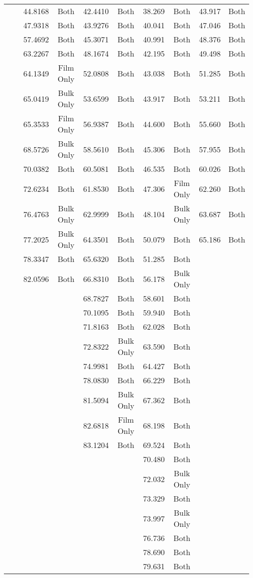 \documentclass[a4paper,12pt,oneside]{article}%
\begin{document}
\begin{table}[b]
\begin{tabular}{cccccccccc}
		&  & 44.8168 & Both & 42.4410 & Both & 38.269 & Both & 43.917 & Both \\
		&  & 47.9318 & Both & 43.9276 & Both & 40.041 & Both & 47.046 & Both \\
		&  & 57.4692 & Both & 45.3071 & Both & 40.991 & Both & 48.376 & Both \\
		&  & 63.2267 & Both & 48.1674 & Both & 42.195 & Both & 49.498 & Both \\
		&  & 64.1349 & Film Only & 52.0808 & Both & 43.038 & Both & 51.285 & Both \\
		&  & 65.0419 & Bulk Only & 53.6599 & Both & 43.917 & Both & 53.211 & Both \\
		&  & 65.3533 & Film Only & 56.9387 & Both & 44.600 & Both & 55.660 & Both \\
		&  & 68.5726 & Bulk Only & 58.5610 & Both & 45.306 & Both & 57.955 & Both \\
		&  & 70.0382 & Both & 60.5081 & Both & 46.535 & Both & 60.026 & Both \\
		&  & 72.6234 & Both & 61.8530 & Both & 47.306 & Film Only & 62.260 & Both \\
		&  & 76.4763 & Bulk Only & 62.9999 & Both & 48.104 & Bulk Only & 63.687 & Both \\
		&  & 77.2025 & Bulk Only & 64.3501 & Both & 50.079 & Both & 65.186 & Both \\
		&  & 78.3347 & Both & 65.6320 & Both & 51.285 & Both &  &  \\
		&  & 82.0596 & Both & 66.8310 & Both & 56.178 & Bulk Only &  &  \\
		&  &  &  & 68.7827 & Both & 58.601 & Both &  &  \\
		&  &  &  & 70.1095 & Both & 59.940 & Both &  &  \\
		&  &  &  & 71.8163 & Both & 62.028 & Both &  &  \\
		&  &  &  & 72.8322 & Bulk Only & 63.590 & Both &  &  \\
		&  &  &  & 74.9981 & Both & 64.427 & Both &  &  \\
		&  &  &  & 78.0830 & Both & 66.229 & Both &  &  \\
		&  &  &  & 81.5094 & Bulk Only & 67.362 & Both &  &  \\
		&  &  &  & 82.6818 & Film Only & 68.198 & Both &  &  \\
		&  &  &  & 83.1204 & Both & 69.524 & Both &  &  \\
		&  &  &  &  &  & 70.480 & Both &  &  \\
		&  &  &  &  &  & 72.032 & Bulk Only &  &  \\
		&  &  &  &  &  & 73.329 & Both &  &  \\
		&  &  &  &  &  & 73.997 & Bulk Only &  &  \\
		&  &  &  &  &  & 76.736 & Both &  &  \\
		&  &  &  &  &  & 78.690 & Both &  &  \\
		&  &  &  &  &  & 79.631 & Both &  & \\
	\end{tabular}
	\label{tab:Sub_Annealing_XRD_Peaks}
\end{table}
\end{document}
